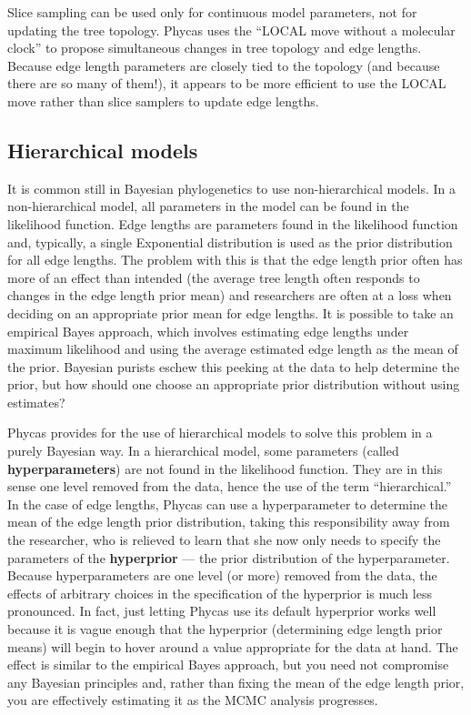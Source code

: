\documentclass[10pt]{article}
\newcommand{\term}[1]{{\bfseries #1}\index{#1}}		%
\begin{document}
Slice sampling can be used only for continuous model parameters, not for updating the tree topology. Phycas uses the \citet{LargetSimon1999} ``LOCAL move without a molecular clock'' to propose simultaneous changes in tree topology and edge lengths. Because edge length parameters are closely tied to the topology (and because there are so many of them!), it appears to be more efficient to use the LOCAL move rather than slice samplers to update edge lengths.

\subsection{Hierarchical models}

It is common still in Bayesian phylogenetics to use non-hierarchical models. In a non-hierarchical model, all parameters in the model can be found in the likelihood function. Edge lengths are parameters found in the likelihood function and, typically, a single Exponential distribution is used as the prior distribution for all edge lengths. The problem with this is that the edge length prior often has more of an effect than intended (the average tree length often responds to changes in the edge length prior mean) and researchers are often at a loss when deciding on an appropriate prior mean for edge lengths. It is possible to take an empirical Bayes approach, which involves estimating edge lengths under maximum likelihood and using the average estimated edge length as the mean of the prior. Bayesian purists eschew this peeking at the data to help determine the prior, but how should one choose an appropriate prior distribution without using estimates? 

Phycas provides for the use of hierarchical models to solve this problem in a purely Bayesian way. In a hierarchical model, some parameters (called \term{hyperparameters}) are not found in the likelihood function. They are in this sense one level removed from the data, hence the use of the term ``hierarchical.'' In the case of edge lengths, Phycas can use a hyperparameter to determine the mean of the edge length prior distribution, taking this responsibility away from the researcher, who is relieved to learn that she now only needs to specify the parameters of the \term{hyperprior} --- the prior distribution of the hyperparameter. Because hyperparameters are one level (or more) removed from the data, the effects of arbitrary choices in the specification of the hyperprior is much less pronounced. In fact, just letting Phycas use its default hyperprior works well because it is vague enough that the hyperprior (determining edge length prior means) will begin to hover around a value appropriate for the data at hand. The effect is similar to the empirical Bayes approach, but you need not compromise any Bayesian principles and, rather than fixing the mean of the edge length prior, you are effectively estimating it as the MCMC analysis progresses.
\end{document}
